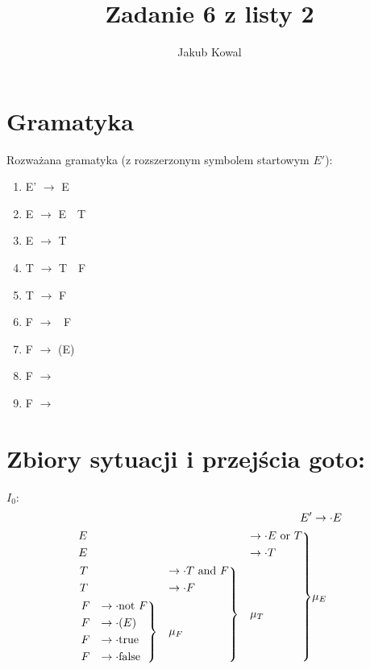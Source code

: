 \documentclass{article}
\title{Zadanie 6 z listy 2}
\author{Jakub Kowal}
\date{}
\begin{document}
\section*{Gramatyka}
Rozważana gramatyka (z rozszerzonym symbolem startowym $E'$):
\begin{center}
\begin{enumerate}
\item E' $\to$ E \\
\item E $\to$ E\ \ T \\
\item E $\to$ T \\
\item T $\to$ T\ \ F \\
\item T $\to$ F \\
\item F $\to$ \ F \\
\item F $\to$ (E) \\
\item F $\to$  \\
\item F $\to$ 
\end{enumerate}
\end{center}

\section*{Zbiory sytuacji i przejścia goto:}
$I_0$:\\
\[
\begin{aligned}
E' &\to \cdot E \\
\begin{rcases}
E &\to \cdot E\ \text{or}\ T \\
E &\to \cdot T \\
\begin{rcases}
T &\to \cdot T\ \text{and}\ F \\
T &\to \cdot F \\
\begin{rcases}
F &\to \cdot \text{not}\ F \\
F &\to \cdot (E) \\
F &\to \cdot \text{true} \\
F &\to \cdot \text{false}
\end{rcases} & \text{$\mu_{F}$}
\end{rcases} & \text{$\mu_{T}$}
\end{rcases} & \text{$\mu_{E}$}
\end{aligned}
\]\\
\end{document}
